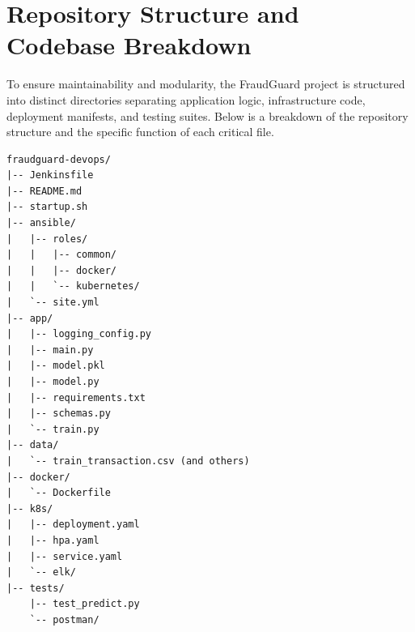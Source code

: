 \documentclass[12pt,a4paper]{article}
\begin{document}
\section{Repository Structure and Codebase Breakdown}
To ensure maintainability and modularity, the FraudGuard project is structured into distinct directories separating application logic, infrastructure code, deployment manifests, and testing suites. Below is a breakdown of the repository structure and the specific function of each critical file.

\begin{verbatim}
fraudguard-devops/
|-- Jenkinsfile
|-- README.md
|-- startup.sh
|-- ansible/
|   |-- roles/
|   |   |-- common/
|   |   |-- docker/
|   |   `-- kubernetes/
|   `-- site.yml
|-- app/
|   |-- logging_config.py
|   |-- main.py
|   |-- model.pkl
|   |-- model.py
|   |-- requirements.txt
|   |-- schemas.py
|   `-- train.py
|-- data/
|   `-- train_transaction.csv (and others)
|-- docker/
|   `-- Dockerfile
|-- k8s/
|   |-- deployment.yaml
|   |-- hpa.yaml
|   |-- service.yaml
|   `-- elk/
|-- tests/
    |-- test_predict.py
    `-- postman/
\end{verbatim}

\newpage
\end{document}
